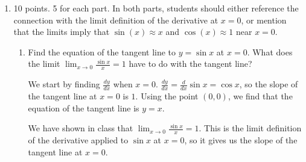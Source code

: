 \documentclass{article}
\begin{document}
\begin{enumerate}
\begin{enumerate}
      \begin{solution}
        \begin{align*}
          \frac{d}{dx} \left(\fcolorbox{red}{white}{$\displaystyle
              \fcolorbox{blue}{white}{$\displaystyle  \sec \left(2 x^ { 3}
                \right)$}^ { \frac{1}{2}} $}\right) = {} & \frac{1}{2}
          \sec \left(2 x^ { 3} \right)^ { -\frac{1}{2}} \cdot \frac{d}{dx}
          \left(\fcolorbox{red}{white}{$\displaystyle \sec
              \left(\fcolorbox{blue}{white}{$\displaystyle 2 x^ { 3}
                  $}\right)$}\right) \\ 
          = {} & \frac{1}{2} \sec \left(2 x^ { 3} \right)^ { -\frac{1}{2}}
          \cdot \sec \left(2 x^ { 3} \right) \tan \left(2 x^ { 3}
          \right)\cdot 6 x^ { 2}  
        \end{align*}
      \end{solution}

    \end{enumerate}

    \probonly{}

\item 

\begin{grading}
10 points. 5 for each part. In both parts, students should either reference the connection with the limit definition of the derivative at $x=0$, or mention that the limits imply that $\sin(x)\approx x$ and $\cos(x)\approx 1$ near $x=0$.
\end{grading}

\begin{enumerate}

\item

\begin{problem}[\stretch{2}]
Find the equation of the tangent line to $y=\sin x$ at $x=0$. What does the limit $\displaystyle \lim_{x\to0} \frac{\sin x}{x} = 1$ have to do with the tangent line?
\end{problem}

\begin{solution}
We start by finding $\frac{dy}{dx}$ when $x=0$. $\frac{dy}{dx}=
\frac{d}{dx}\sin x = \cos x$, so the slope of the tangent line at
$x=0$ is $1$. Using the point $(0,0)$, we find that 
the equation of the tangent line is $\boxed{y=x}$.

We have shown in class that $\displaystyle \lim_{x\to0} \frac{\sin x}{x} = 1$. This is the limit definition of the derivative applied to $\sin x$ at $x=0$, so it gives us the slope of the tangent line at $x=0$. 


\end{solution}
\end{enumerate}
\end{enumerate}
\end{document}
